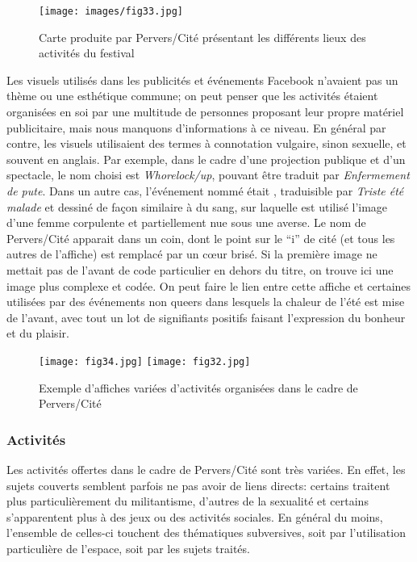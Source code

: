 \begin{figure}[ht]
	\centering
	\texttt{[image: images/fig33.jpg]}
	\caption{Carte produite par Pervers/Cité présentant les différents lieux des activités du festival}\label{fig:carte_perverscite}
\end{figure}

Les visuels utilisés dans les publicités et événements Facebook n'avaient pas un thème ou une esthétique commune; on peut penser que les activités étaient organisées en soi par une multitude de personnes proposant leur propre matériel publicitaire, mais nous manquons d'informations à ce niveau.
En général par contre, les visuels utilisaient des termes à connotation vulgaire, sinon sexuelle, et souvent en anglais.
Par exemple, dans le cadre d'une projection publique et d'un spectacle, le nom choisi est \emph{Whorelock/up}, pouvant être traduit par \emph{Enfermement de pute}.
Dans un autre cas, l'événement nommé était , traduisible par \emph{Triste été malade} et dessiné de façon similaire à du sang, sur laquelle est utilisé l'image d'une femme corpulente et partiellement nue sous une averse.
Le nom de Pervers/Cité apparait dans un coin, dont le point sur le \enquote{i} de cité (et tous les autres de l'affiche) est remplacé par un cœur brisé.
Si la première image ne mettait pas de l'avant de code particulier en dehors du titre, on trouve ici une image plus complexe et codée.
On peut faire le lien entre cette affiche et certaines utilisées par des événements non queers dans lesquels la chaleur de l'été est mise de l'avant, avec tout un lot de signifiants positifs faisant l'expression du bonheur et du plaisir.

\begin{figure}
\centering
{}
{\texttt{[image: fig34.jpg]}}
{\texttt{[image: fig32.jpg]}}
\caption{Exemple d'affiches variées d'activités organisées dans le cadre de Pervers/Cité}\label{figs3132}
\end{figure}

\subsubsection{Activités}
\label{subsec:activitesperverscite}
Les activités offertes dans le cadre de Pervers/Cité sont très variées.
En effet, les sujets couverts semblent parfois ne pas avoir de liens directs: certains traitent plus particulièrement du militantisme, d'autres de la sexualité et certains s'apparentent plus à des jeux ou des activités sociales.
En général du moins, l'ensemble de celles-ci touchent des thématiques subversives, soit par l'utilisation particulière de l'espace, soit par les sujets traités.

